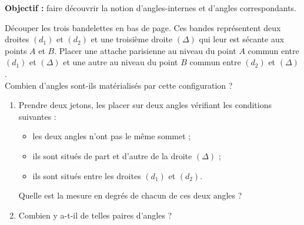 \begin{activite}
    \vspace*{-7mm}    
    {\bf Objectif :} faire découvrir la notion d'angles-internes et d'angles correspondants.
    {\renewcommand{\baselinestretch}{1.15}\selectfont    
    \vspace*{-3mm}
    \partie[préparation]
    \vspace*{-5mm}
       Découper les trois bandelettes en bas de page. Ces bandes représentent deux droites $(d_1)$ et $(d_2)$ et une troisième droite $(\Delta)$ qui leur est sécante aux points $A$ et $B$. Placer une attache parisienne au niveau du point $A$ commun entre $(d_1)$ et $(\Delta)$ et une autre au niveau du point $B$ commun entre $(d_2)$ et $(\Delta)$. \\
       Combien d'angles sont-ils matérialisés par cette configuration ?
    \vspace*{-3mm}
    \vspace*{-10mm}    
       \begin{enumerate}
          \item Prendre deux jetons, les placer sur deux angles vérifiant les conditions suivantes :
             \begin{itemize}
                \item les deux angles n'ont pas le même sommet ;
                \item ils sont situés de part et d'autre de la droite $(\Delta)$ ;
                \item ils sont situés \og entre \fg{} les droites $(d_1)$ et $(d_2)$.
             \end{itemize}
          Quelle est la mesure en degrés de chacun de ces deux angles ?
          \item Combien y a-t-il de telles paires d'angles ?
          

\end{enumerate}}
\end{activite}
